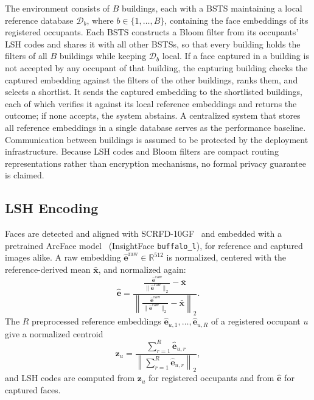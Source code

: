 \documentclass[pdflatex,sn-mathphys-num]{sn-jnl}%
\providecommand{\code}[1]{\texttt{#1}}%
\theoremstyle{thmstyleone}%
\theoremstyle{thmstyletwo}%
\theoremstyle{thmstylethree}%
\begin{document}
The environment consists of $B$ buildings, each with a BSTS maintaining a local reference database $\mathcal{D}_b$, where $b\in\{1,\ldots,B\}$, containing the face embeddings of its registered occupants. Each BSTS constructs a Bloom filter from its occupants' LSH codes and shares it with all other BSTSs, so that every building holds the filters of all $B$ buildings while keeping $\mathcal{D}_b$ local. If a face captured in a building is not accepted by any occupant of that building, the capturing building checks the captured embedding against the filters of the other buildings, ranks them, and selects a shortlist. It sends the captured embedding to the shortlisted buildings, each of which verifies it against its local reference embeddings and returns the outcome; if none accepts, the system abstains. A centralized system that stores all reference embeddings in a single database serves as the performance baseline. Communication between buildings is assumed to be protected by the deployment infrastructure. Because LSH codes and Bloom filters are compact routing representations rather than encryption mechanisms, no formal privacy guarantee is claimed.

\subsection{LSH Encoding}
\label{subsec:lsh_encoding}

Faces are detected and aligned with SCRFD-10GF~\cite{guo2022} and embedded with a pretrained ArcFace model~\cite{deng2019} (InsightFace \code{buffalo\_l}), for reference and captured images alike. A raw embedding $\hat{\mathbf{e}}^{\mathrm{raw}}\in\mathbb{R}^{512}$ is normalized, centered with the reference-derived mean $\bar{\mathbf{x}}$, and normalized again:
\begin{equation}
    \hat{\mathbf{e}}
    =
    \frac{
        \frac{\hat{\mathbf{e}}^{\mathrm{raw}}}{\|\hat{\mathbf{e}}^{\mathrm{raw}}\|_2}
        - \bar{\mathbf{x}}
    }{
        \left\|
        \frac{\hat{\mathbf{e}}^{\mathrm{raw}}}{\|\hat{\mathbf{e}}^{\mathrm{raw}}\|_2}
        - \bar{\mathbf{x}}
        \right\|_2
    }.
    \label{eq:embedding_preprocessing}
\end{equation}
The $R$ preprocessed reference embeddings $\hat{\mathbf{e}}_{u,1},\ldots,\hat{\mathbf{e}}_{u,R}$ of a registered occupant $u$ give a normalized centroid
\begin{equation}
    \mathbf{z}_u
    =
    \frac{
        \sum_{r=1}^{R}\hat{\mathbf{e}}_{u,r}
    }{
        \left\|\sum_{r=1}^{R}\hat{\mathbf{e}}_{u,r}\right\|_2
    },
    \label{eq:identity_centroid}
\end{equation}
and LSH codes are computed from $\mathbf{z}_u$ for registered occupants and from $\hat{\mathbf{e}}$ for captured faces.
\end{document}
